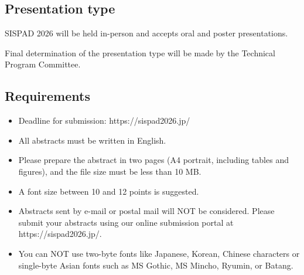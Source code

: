 \subsection{Presentation type}\label{AA}
SISPAD 2026 will be held in-person and accepts oral and poster presentations.

Final determination of the presentation type will be made by the Technical Program Committee.

\subsection{Requirements}
\begin{itemize}
\item Deadline for submission: https://sispad2026.jp/
\item All abstracts must be written in English.
\item Please prepare the abstract in two pages (A4 portrait, including tables and figures), and the file size must be less than 10 MB.
\item A font size between 10 and 12 points is suggested.
\item Abstracts sent by e-mail or postal mail will NOT be considered. Please submit your abstracts using our online submission portal at https://sispad2026.jp/.
\item You can NOT use two-byte fonts like Japanese, Korean, Chinese characters or single-byte Asian fonts such as MS Gothic, MS Mincho, Ryumin, or Batang.
\end{itemize}
